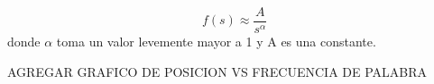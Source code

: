 $$f(s) \approx \frac{A}{s^{\alpha}}$$
donde $\alpha$ toma un valor levemente mayor a 1 y A es una constante.

AGREGAR GRAFICO DE POSICION VS FRECUENCIA DE PALABRA




